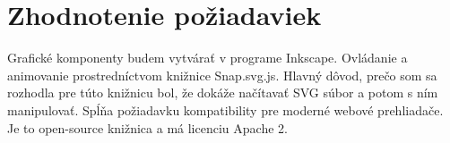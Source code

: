 \section{Zhodnotenie požiadaviek}
Grafické komponenty budem vytvárať v programe Inkscape. Ovládanie a animovanie prostredníctvom knižnice Snap.svg.js. Hlavný dôvod, prečo som sa rozhodla pre túto knižnicu bol, že dokáže načítavať SVG súbor a potom s ním manipulovať.
Spĺňa požiadavku kompatibility pre moderné webové prehliadače. Je to open-source knižnica a má licenciu Apache 2.  